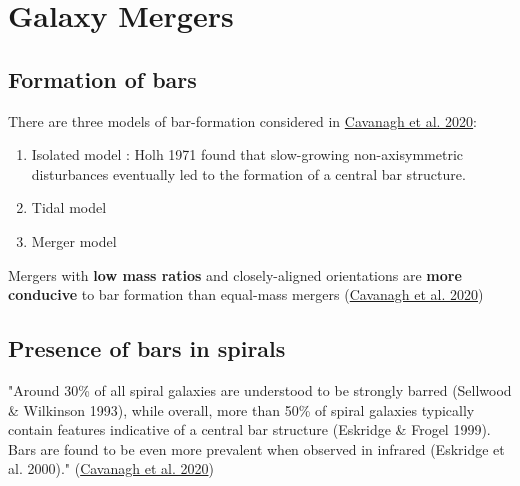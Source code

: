 
\chapter{Galaxy Mergers }


\section{Formation of bars}

There are three models of bar-formation considered in \href{https://arxiv.org/pdf/2006.14847.pdf}{Cavanagh et al. 2020}:
\begin{enumerate}
    \item Isolated model : Holh 1971 found that slow-growing non-axisymmetric disturbances eventually led to the formation of a central bar structure.
    \item Tidal model
    \item Merger model
\end{enumerate}

Mergers with \textbf{low mass ratios} and closely-aligned orientations are \textbf{more conducive} to bar formation than equal-mass mergers (\href{https://arxiv.org/pdf/2006.14847.pdf}{Cavanagh et al. 2020})

\section{Presence of bars in spirals}

"Around 30\% of all spiral galaxies are understood to be strongly barred (Sellwood \& Wilkinson 1993), while overall, more than 50\% of spiral galaxies typically contain features indicative of a central bar structure (Eskridge \& Frogel 1999). Bars are found to be even more prevalent when observed in infrared (Eskridge et al. 2000)." (\href{https://arxiv.org/pdf/2006.14847.pdf}{Cavanagh et al. 2020})